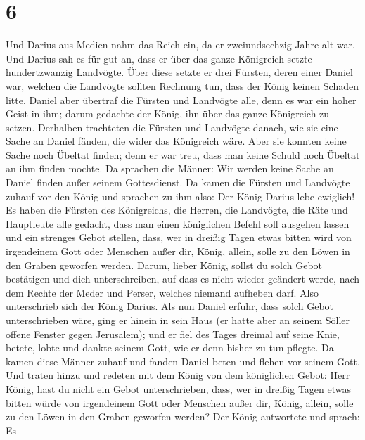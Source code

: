 \hypertarget{section-5}{%
\section{6}\label{section-5}}

 Und Darius aus Medien nahm das Reich ein, da er
zweiundsechzig Jahre alt war.  Und Darius sah es für gut
an, dass er über das ganze Königreich setzte hundertzwanzig Landvögte.
 Über diese setzte er drei Fürsten, deren einer Daniel
war, welchen die Landvögte sollten Rechnung tun, dass der König keinen
Schaden litte.  Daniel aber übertraf die Fürsten und
Landvögte alle, denn es war ein hoher Geist in ihm; darum gedachte der
König, ihn über das ganze Königreich zu setzen.  Derhalben
trachteten die Fürsten und Landvögte danach, wie sie eine Sache an
Daniel fänden, die wider das Königreich wäre. Aber sie konnten keine
Sache noch Übeltat finden; denn er war treu, dass man keine Schuld noch
Übeltat an ihm finden mochte.  Da sprachen die Männer: Wir
werden keine Sache an Daniel finden außer seinem Gottesdienst.
 Da kamen die Fürsten und Landvögte zuhauf vor den König
und sprachen zu ihm also: Der König Darius lebe ewiglich! 
Es haben die Fürsten des Königreichs, die Herren, die Landvögte, die
Räte und Hauptleute alle gedacht, dass man einen königlichen Befehl soll
ausgehen lassen und ein strenges Gebot stellen, dass, wer in dreißig
Tagen etwas bitten wird von irgendeinem Gott oder Menschen außer dir,
König, allein, solle zu den Löwen in den Graben geworfen werden.
 Darum, lieber König, sollst du solch Gebot bestätigen und
dich unterschreiben, auf dass es nicht wieder geändert werde, nach dem
Rechte der Meder und Perser, welches niemand aufheben darf.
 Also unterschrieb sich der König Darius. 
Als nun Daniel erfuhr, dass solch Gebot unterschrieben wäre, ging er
hinein in sein Haus (er hatte aber an seinem Söller offene Fenster gegen
Jerusalem); und er fiel des Tages dreimal auf seine Knie, betete, lobte
und dankte seinem Gott, wie er denn bisher zu tun pflegte.
 Da kamen diese Männer zuhauf und fanden Daniel beten und
flehen vor seinem Gott.  Und traten hinzu und redeten mit
dem König von dem königlichen Gebot: Herr König, hast du nicht ein Gebot
unterschrieben, dass, wer in dreißig Tagen etwas bitten würde von
irgendeinem Gott oder Menschen außer dir, König, allein, solle zu den
Löwen in den Graben geworfen werden? Der König antwortete und sprach: Es
